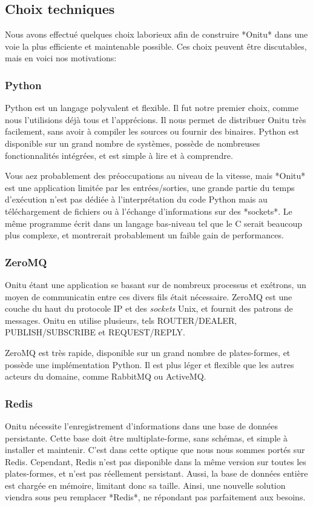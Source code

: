 \documentclass[letterpaper,10pt,english]{sphinxmanual}
\begin{document}
\subsection{Choix techniques}
\label{intro:logbook}\label{intro:technical-choices}
Nous avons effectué quelques choix laborieux afin de construire *Onitu* dans une voie la plus efficiente et maintenable possible. Ces choix peuvent être discutables, mais en voici nos motivations:


\subsubsection{Python}
\label{intro:python}
Python est un langage polyvalent et flexible. Il fut notre premier choix, comme nous l'utilisions déjà tous et l'apprécions. Il nous permet de distribuer Onitu très facilement, sans avoir à compiler les sources ou fournir des binaires. Python est disponible sur un grand nombre de systèmes, possède de nombreuses fonctionnalités intégrées, et est simple à lire et à comprendre.

Vous aez probablement des préoccupations au niveau de la vitesse, mais *Onitu* est une application limitée par les entrées/sorties, une grande partie du temps d'exécution n'est pas dédiée à l'interprétation du code Python mais au téléchargement de fichiers ou à l'échange d'informations sur des *sockets*. Le même programme écrit dans un langage bas-niveau tel que le C serait beaucoup plus complexe, et montrerait probablement un faible gain de performances.


\subsubsection{ZeroMQ}
\label{intro:zeromq}
Onitu étant une application se basant sur de nombreux processus et exétrons, un moyen de communicatin entre ces divers fils était nécessaire. ZeroMQ est une couche du haut du protocole IP et des \emph{sockets} Unix, et fournit des patrons de messages. Onitu en utilise plusieurs, tels ROUTER/DEALER, PUBLISH/SUBSCRIBE et REQUEST/REPLY.

ZeroMQ est très rapide, disponible sur un grand nombre de plates-formes, et possède une implémentation Python. Il est plus léger et flexible que les autres acteurs du domaine, comme RabbitMQ ou ActiveMQ.


\subsubsection{Redis}
\label{intro:redis}
Onitu nécessite l'enregistrement d'informations dans une base de données persistante. Cette base doit être multiplate-forme, sans schémas, et simple à installer et maintenir. C'est dans cette optique que nous nous sommes portés sur Redis. Cependant, Redis n'est pas disponible dans la même version sur toutes les plates-formes, et n'est pas réellement persistant. Aussi, la base de données entière est chargée en mémoire, limitant donc sa taille. Ainsi, une nouvelle solution viendra sous peu remplacer *Redis*, ne répondant pas parfaitement aux besoins.
\end{document}
